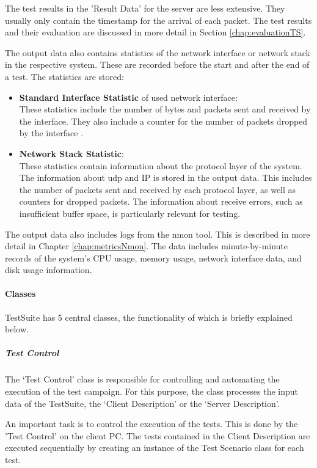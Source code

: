 The test results in the 'Result Data' for the server are less extensive. They usually only contain the timestamp for the arrival of each packet. The test results and their evaluation are discussed in more detail in Section \ref{chap:evaluationTS}.

The output data also contains statistics of the network interface or network stack in the respective system. These are recorded before the start and after the end of a test. The statistics are stored:
\begin{itemize}
	\item \textbf{Standard Interface Statistic} of used network interface: \\
	These statistics include the number of bytes and packets sent and received by the interface. They also include a counter for the number of packets dropped by the interface \cite{tsd03}.
	\item \textbf{Network Stack Statistic}: \\
	These statistics contain information about the protocol layer of the system. The information about \ac{udp} and IP is stored in the output data. This includes the number of packets sent and received by each protocol layer, as well as counters for dropped packets. The information about receive errors, such as insufficient buffer space, is particularly relevant for testing.
\end{itemize}

The output data also includes logs from the nmon tool. This is described in more detail in Chapter \ref{chap:metricsNmon}. The data includes minute-by-minute records of the system's \ac{CPU} usage, memory usage, network interface data, and disk usage information.

\paragraph{Classes}
TestSuite has 5 central classes, the functionality of which is briefly explained below.

\subparagraph{Test Control}
The `Test Control' class is responsible for controlling and automating the execution of the test campaign. For this purpose, the class processes the input data of the TestSuite, the `Client Description' or the `Server Description'.

An important task is to control the execution of the tests. This is done by the 'Test Control' on the client PC. The tests contained in the Client Description are executed sequentially by creating an instance of the Test Scenario class for each test.

